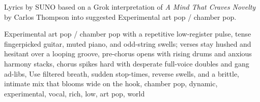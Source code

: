 
\begin{notes}
Lyrics by SUNO based on a Grok interpretation of \emph{A Mind That Craves Novelty} by Carlos Thompson into suggested Experimental art pop / chamber pop.
\end{notes}
\begin{style}
Experimental art pop / chamber pop with a repetitive low-register pulse, tense fingerpicked guitar, muted piano, and odd-string swells; verses stay hushed and hesitant over a looping groove, pre-chorus opens with rising drums and anxious harmony stacks, chorus spikes hard with desperate full-voice doubles and gang ad-libs, Use filtered breath, sudden stop-times, reverse swells, and a brittle, intimate mix that blooms wide on the hook, chamber pop, dynamic, experimental, vocal, rich, low, art pop, world
\end{style}
